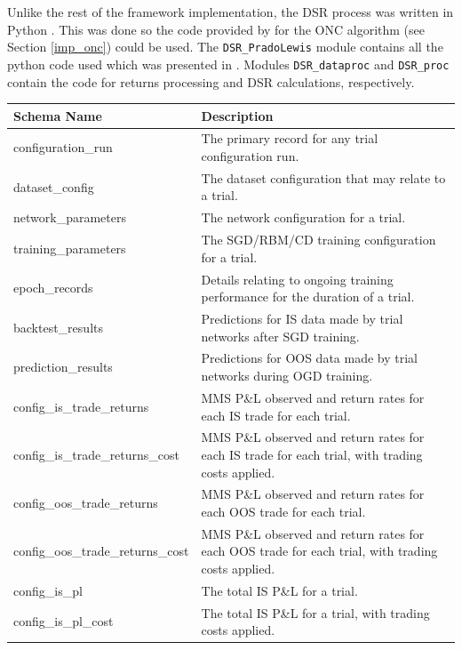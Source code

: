 \documentclass[a4paper,11pt,oneside]{article}
\theoremstyle{plain}
\theoremstyle{definition}
\begin{document}
	Unlike the rest of the framework implementation, the DSR process was written in Python \citep{Python}. This was done so the code provided by \citet{PradoDSR} for the ONC algorithm (see Section \ref{imp_onc}) could be used. The \texttt{DSR\_PradoLewis} module \citep{DCDSR_PradoLewis} contains all the python code used which was presented in \citep{PradoDSR}. Modules \texttt{DSR\_dataproc} \citep{DCDSR_Dataproc} and \texttt{DSR\_proc} \citep{DCDSR_proc} contain the code for returns processing and DSR calculations, respectively.
	
	\begin{table}[H]
		\begin{tabular}{|p{0.33\linewidth}|p{0.67\linewidth}|}
			\hline
			\textbf{Schema Name} &\textbf{Description}  \\\hline	
			{configuration\_run} & {The primary record for any trial configuration run.} \\\hline
			{dataset\_config} & {The dataset configuration that may relate to a trial.} \\\hline
			{network\_parameters} & {The network configuration for a trial.} \\\hline
			{training\_parameters} & {The SGD/RBM/CD training configuration for a trial.}  \\\hline
			{epoch\_records} & {Details relating to ongoing training performance for the duration of a trial.}  \\\hline
			{backtest\_results} & {Predictions for IS data made by trial networks after SGD training.}  \\\hline
			{prediction\_results} & {Predictions for OOS data made by trial networks during OGD training.}  \\\hline
			{config\_is\_trade\_returns} & {MMS P\&L observed and return rates for each IS trade for each trial.}  \\\hline
			{config\_is\_trade\_returns\_cost} & {MMS P\&L observed and return rates for each IS trade for each trial, with trading costs applied.}  \\\hline
			{config\_oos\_trade\_returns} & {MMS P\&L observed and return rates for each OOS trade for each trial.}  \\\hline
			{config\_oos\_trade\_returns\_cost} & {MMS P\&L observed and return rates for each OOS trade for each trial, with trading costs applied.}  \\\hline
			{config\_is\_pl} & {The total IS P\&L for a trial.}  \\\hline
			{config\_is\_pl\_cost} & {The total IS P\&L for a trial, with trading costs applied.}  \\\hline

\end{tabular}
\end{table}
\end{document}
